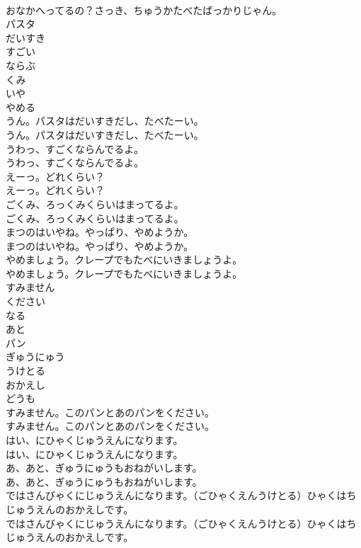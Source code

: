 \documentclass[8pt]{extreport}
\begin{document}
\begin{CJK}{UTF8}{min}
\\	おなかへってるの？さっき、ちゅうかたべたばっかりじゃん。 
\\	パスタ
\\	だいすき
\\	すごい
\\	ならぶ
\\	くみ
\\	いや
\\	やめる
\\	うん。パスタはだいすきだし、たべたーい。	
\\	うん。パスタはだいすきだし、たべたーい。 
\\	うわっ、すごくならんでるよ。	
\\	うわっ、すごくならんでるよ。 
\\	えーっ。どれくらい？	
\\	えーっ。どれくらい？ 
\\	ごくみ、ろっくみくらいはまってるよ。	
\\	ごくみ、ろっくみくらいはまってるよ。 
\\	まつのはいやね。やっぱり、やめようか。	
\\	まつのはいやね。やっぱり、やめようか。 
\\	やめましょう。クレープでもたべにいきましょうよ。	
\\	やめましょう。クレープでもたべにいきましょうよ。 
\\	すみません
\\	ください
\\	なる
\\	あと
\\	パン
\\	ぎゅうにゅう
\\	うけとる
\\	おかえし
\\	どうも
\\	すみません。このパンとあのパンをください。	
\\	すみません。このパンとあのパンをください。 
\\	はい、にひゃくじゅうえんになります。	
\\	はい、にひゃくじゅうえんになります。 
\\	あ、あと、ぎゅうにゅうもおねがいします。	
\\	あ、あと、ぎゅうにゅうもおねがいします。 
\\	ではさんびゃくにじゅうえんになります。（ごひゃくえんうけとる）ひゃくはちじゅうえんのおかえしです。	
\\	ではさんびゃくにじゅうえんになります。（ごひゃくえんうけとる）ひゃくはちじゅうえんのおかえしです。 

\end{CJK}
\end{document}
